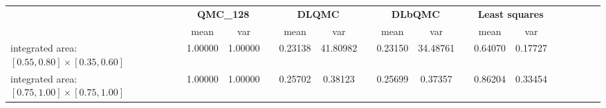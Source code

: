 \begin{tabular}{lcccccccccccccccc}
\toprule
 &\multicolumn{2}{c}{\textbf{QMC\_128}}&&\multicolumn{2}{c}{\textbf{DLQMC}}&&\multicolumn{2}{c}{\textbf{DLbQMC}}&&\multicolumn{2}{c}{\textbf{Least squares}}\\ 
\cmidrule(r){2-3} \cmidrule(r){5-6} \cmidrule(r){8-9}
 &mean&var&&mean&var&&mean&var&&mean&var\\ 
\midrule
integrated area: $[0.55,0.80]\times [0.35,0.60]$ &1.00000&1.00000&&0.23138&41.80982&&0.23150&34.48761&&0.64070&0.17727\\ 
integrated area: $[0.75,1.00]\times [0.75,1.00]$ &1.00000&1.00000&&0.25702&0.38123&&0.25699&0.37357&&0.86204&0.33454\\ 
\bottomrule
\end{tabular}

